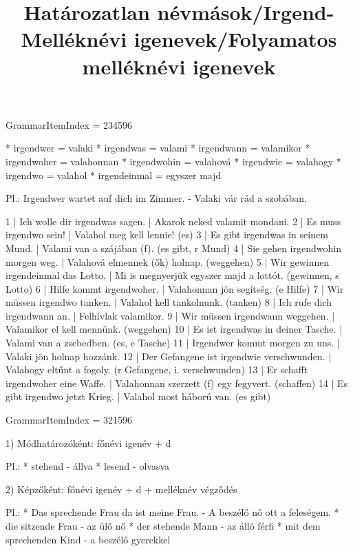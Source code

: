 \title{Határozatlan névmások/Irgend-}

GrammarItemIndex = 234596

\begin{desc}
* irgendwer = valaki
* irgendwas = valami
* irgendwann = valamikor
* irgendwoher = valahonnan
* irgendwohin = valahová
* irgendwie = valahogy
* irgendwo = valahol
* irgendeinmal = egyszer majd

Pl.: Irgendwer wartet auf dich im Zimmer. - Valaki vár rád a szobában.
\end{desc}

\begin{exmp}
1 | Ich wolle dir irgendwas sagen. | Akarok neked valamit mondani.
2 | Es muss irgendwo sein! | Valahol meg kell lennie! (es)
3 | Es gibt irgendwas in seinem Mund. | Valami van a szájában (f). (es gibt, r Mund)
4 | Sie gehen irgendwohin morgen weg. | Valahová elmennek (ők) holnap. (weggehen)
5 | Wir gewinnen irgendeinmal das Lotto. | Mi is megnyerjük egyszer majd a lottót. (gewinnen, s Lotto)
6 | Hilfe kommt irgendwoher. | Valahonnan jön segítség. (e Hilfe)
7 | Wir müssen irgendwo tanken. | Valahol kell tankolnunk. (tanken)
8 | Ich rufe dich irgendwann an. | Felhívlak valamikor.
9 | Wir müssen irgendwann weggehen. | Valamikor el kell mennünk. (weggehen)
10 | Es ist irgendwas in deiner Tasche. | Valami van a zsebedben. (es, e Tasche)
11 | Irgendwer kommt morgen zu uns. | Valaki jön holnap hozzánk.
12 | Der Gefangene ist irgendwie verschwunden. | Valahogy eltűnt a fogoly. (r Gefangene, i. verschwunden)
13 | Er schafft irgendwoher eine Waffe. | Valahonnan szerzett (f) egy fegyvert. (schaffen)
14 | Es gibt irgendwo jetzt Krieg. | Valahol most háború van. (es gibt)
\end{exmp}

\title{Melléknévi igenevek/Folyamatos melléknévi igenevek}

GrammarItemIndex = 321596

\begin{desc}
1) Módhatározóként: főnévi igenév + d

Pl.: * stehend - állva
* lesend - olvasva

2) Képzőként: főnévi igenév + d + melléknév végződés

Pl.: * Das sprechende Frau da ist meine Frau. - A beszélő nő ott a feleségem.
* die sitzende Frau - az ülő nő
* der stehende Mann - az álló férfi
* mit dem sprechenden Kind - a beszélő gyerekkel
\end{desc}

